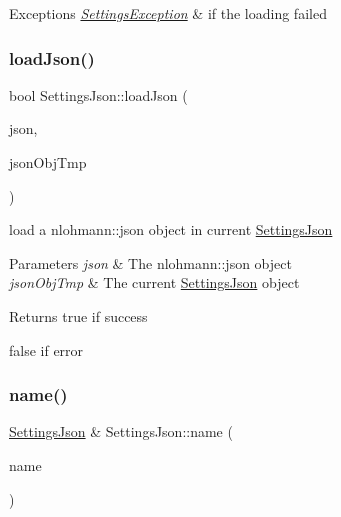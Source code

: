 \begin{DoxyExceptions}{Exceptions}
{\em \hyperlink{class_settings_json_1_1_settings_exception}{Settings\+Exception}} & if the loading failed \\
\hline
\end{DoxyExceptions}
\mbox{\label{class_settings_json_aa2379955d326fae834583000cb323d1a}} 
\subsubsection{\texorpdfstring{load\+Json()}{loadJson()}}
{\footnotesize\ttfamily bool Settings\+Json\+::load\+Json (\begin{DoxyParamCaption}\item[{nlohmann\+::json const \&}]{json,  }\item[{\hyperlink{class_settings_json}{Settings\+Json} \&}]{json\+Obj\+Tmp }\end{DoxyParamCaption})}



load a nlohmann\+::json object in current \hyperlink{class_settings_json}{Settings\+Json} 


\begin{DoxyParams}{Parameters}
{\em json} & The nlohmann\+::json object \\
\hline
{\em json\+Obj\+Tmp} & The current \hyperlink{class_settings_json}{Settings\+Json} object \\
\hline
\end{DoxyParams}
\begin{DoxyReturn}{Returns}
true if success 

false if error 
\end{DoxyReturn}
\mbox{\label{class_settings_json_a301eda8c47d1140298fade3907c723d6}} 
\subsubsection{\texorpdfstring{name()}{name()}}
{\footnotesize\ttfamily \hyperlink{class_settings_json}{Settings\+Json} \& Settings\+Json\+::name (\begin{DoxyParamCaption}\item[{std\+::string const \&}]{name }\end{DoxyParamCaption})}



